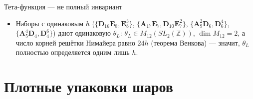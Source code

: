 \documentclass[serif, aspectratio=169]{beamer}
\begin{document}
\begin{frame}{Тета-функция --- не полный инвариант}
{\begin{itemize}
            \item Наборы с одинаковым $h$ ($\{\mathbf{D}_{16}\mathbf{E}_8,\mathbf{E}_8^3\}$, $\{\mathbf{A}_{17}\mathbf{E}_7,\mathbf{D}_{10}\mathbf{E}_7^2\}$, $\{\mathbf{A}_9^2\mathbf{D}_6,\mathbf{D}_6^4\}$, $\{\mathbf{A}_5^4\mathbf{D}_4,\mathbf{D}_4^6\}$) дают одинаковую $\theta_L$: $\theta_L\in M_{12}(SL_2(\mathbb{Z}))$, $\dim M_{12}=2$, а число корней решётки Нимайера равно $24h$ (теорема Венкова) --- значит, $\theta_L$ полностью определяется одним лишь $h$.
        \end{itemize}
    }
\end{frame}

\section{Плотные упаковки шаров}
\end{document}
